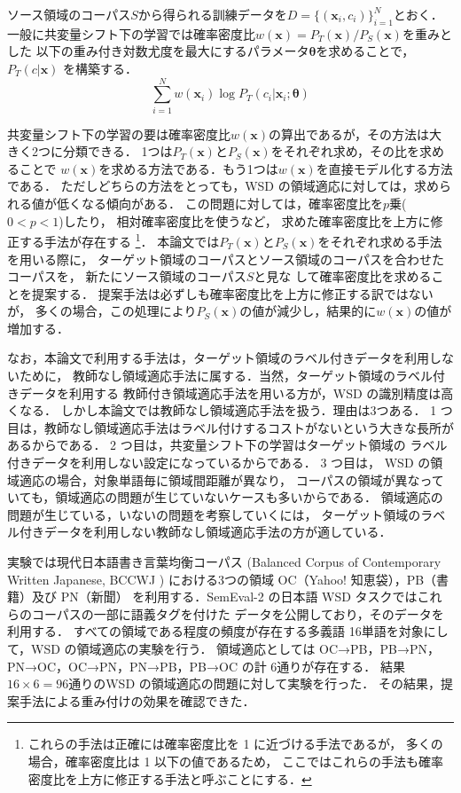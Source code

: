 \documentclass[japanese]{jnlp_1.4}
\begin{document}
ソース領域のコーパス$S$から得られる訓練データを$D = \{ ({\bm x_i},c_i) \}_{i=1}^N$とおく．
一般に共変量シフト下の学習では確率密度比$w({\bm x}) = P_T({\bm x})/P_S({\bm x})$を重みとした
以下の重み付き対数尤度を最大にするパラメータ${\bm \theta}$を求めることで，
$P_T (c|{\bm x})$ を構築する．
\[
\sum_{i=1}^{N} w({\bm x_i}) \log P_T (c_i|{\bm x_i};{\bm \theta})
\]

共変量シフト下の学習の要は確率密度比$w({\bm x})$の算出であるが，その方法は大きく2つに分類できる．
1つは$P_T({\bm x})$と$P_S({\bm x})$をそれぞれ求め，その比を求めることで
$w({\bm x})$を求める方法である．もう1つは$w({\bm x})$を直接モデル化する方法である\cite{sugiyama-2010}．
ただしどちらの方法をとっても，WSD の領域適応に対しては，求められる値が低くなる傾向がある．
この問題に対しては，確率密度比を$p$乗($0 < p < 1$)したり\cite{sugiyama-2006-09-05}，
相対確率密度比\cite{yamada2011relative}を使うなど，
求めた確率密度比を上方に修正する手法が存在する
\footnote{これらの手法は正確には確率密度比を 1 に近づける手法であるが，
多くの場合，確率密度比は 1 以下の値であるため，
ここではこれらの手法も確率密度比を上方に修正する手法と呼ぶことにする．}．
本論文では$P_T({\bm x})$と$P_S({\bm x})$をそれぞれ求める手法を用いる際に，
ターゲット領域のコーパスとソース領域のコーパスを合わせたコーパスを，
新たにソース領域のコーパス$S$と見な
して確率密度比を求めることを提案する．
提案手法は必ずしも確率密度比を上方に修正する訳ではないが，
多くの場合，この処理により$P_S({\bm x})$の値が減少し，結果的に$w({\bm x})$の値が増加する．

なお，本論文で利用する手法は，ターゲット領域のラベル付きデータを利用しないために，
教師なし領域適応手法に属する．当然，ターゲット領域のラベル付きデータを利用する
教師付き領域適応手法を用いる方が，WSD の識別精度は高くなる．
しかし本論文では教師なし領域適応手法を扱う．理由は3つある．
1 つ目は，教師なし領域適応手法はラベル付けするコストがないという大きな長所があるからである．
2 つ目は，共変量シフト下の学習はターゲット領域の
ラベル付きデータを利用しない設定になっているからである．
3 つ目は， WSD の領域適応の場合，対象単語毎に領域間距離が異なり，
コーパスの領域が異なっていても，領域適応の問題が生じていないケースも多いからである．
領域適応の問題が生じている，いないの問題を考察していくには，
ターゲット領域のラベル付きデータを利用しない教師なし領域適応手法の方が適している．

実験では現代日本語書き言葉均衡コーパス (Balanced Corpus of Contemporary Written Japanese, 
BCCWJ \cite{bccwj}) における3つの領域 OC（Yahoo! 知恵袋），PB（書籍）及び PN（新聞）
を利用する．SemEval-2 の日本語 WSD タスク\cite{semeval-2010}ではこれらのコーパスの一部に語義タグを付けた
データを公開しており，そのデータを利用する．
すべての領域である程度の頻度が存在する多義語 16単語を対象にして，WSD の領域適応の実験を行う．
領域適応としては OC→PB，PB→PN，PN→OC，OC→PN，PN→PB，PB→OC の計 6通りが存在する．
結果 $16 \times 6 = 96$通りのWSD の領域適応の問題に対して実験を行った．
その結果，提案手法による重み付けの効果を確認できた．
\end{document}
